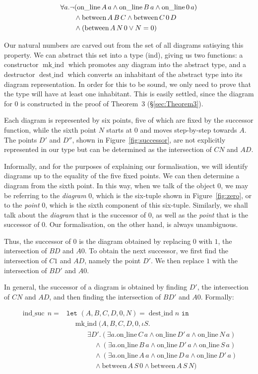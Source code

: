 \documentclass{article}
\DeclareMathOperator{\destind}{dest\_ind}
\DeclareMathOperator{\mkind}{mk\_ind}
\DeclareMathOperator{\indsuc}{ind\_suc}
\newcommand{\online}[2]{\text{on\_line}\,#1\,#2}
\newcommand{\between}[3]{\text{between}\,#1\,#2\,#3}
\newcommand{\Triangle}[4]{\forall #1.\neg(\online{#2}{a}\wedge \online{#3}{a}\wedge \online{#4}{a})}
\begin{document}
\begin{align}
&\Triangle{a}{A}{B}{0} \label{theorem:IndConstraint}\\
&\qquad\wedge \between{A}{B}{C} \wedge \between{C}{0}{D}\notag\\
&\qquad\wedge (\between{A}{N}{0} \vee N = 0)\notag
\end{align}

Our natural numbers are carved out from the set of all diagrams satisying this property. We can abstract this set into a type ($\text{ind}$), giving us two functions: a constructor $\mkind$ which promotes any diagram into the abstract type, and a destructor $\destind$ which converts an inhabitant of the abstract type into its diagram representation. In order for this to be sound, we only need to prove that the type will have at least one inhabitant. This is easily settled, since the diagram for $0$ is constructed in the proof of Theorem~3 (\S\ref{sec:Theorem3}). 

Each diagram is represented by six points, five of which are fixed by the successor function, while the sixth point $N$ starts at $0$ and moves step-by-step towards $A$. The points $D'$ and $D''$, shown in Figure~\ref{fig:successor}, are not explicitly represented in our type but can be determined as the intersection of $CN$ and $AD$.

Informally, and for the purposes of explaining our formalisation, we will identify diagrams up to the equality of the five fixed points. We can then determine a diagram from the sixth point. In this way, when we talk of the object $0$, we may be referring to the \emph{diagram} 0, which is the six-tuple shown in Figure~\ref{fig:zero}, or to the \emph{point} 0, which is the sixth component of this six-tuple. Similarly, we shall talk about the \emph{diagram} that is the successor of 0, as well as the \emph{point} that is the successor of 0. Our formalisation, on the other hand, is always unambiguous.

Thus, the successor of $0$ is the diagram obtained by replacing $0$ with $1$, the intersection of $BD$ and $A0$. To obtain the next successor, we first find the intersection of $C1$ and $AD$, namely the point $D'$. We then replace $1$ with the intersection of $BD'$ and $A0$. 

In general, the successor of a diagram is obtained by finding $D'$, the intersection of $CN$ and $AD$, and then finding the intersection of $BD'$ and $A0$. Formally:

\begin{align*}
\indsuc\, n =& \texttt{let } (A,B,C,D,0,N) = \destind n \texttt{ in}\\
&\quad \mkind (A,B,C,D,0,\iota S.\\
&\quad\qquad \exists D'. (\exists a. \online{C}{a} \wedge \online{D'}{a} \wedge \online{N}{a})\\
&\qquad\qquad \wedge (\exists a. \online{B}{a} \wedge \online{D'}{a} \wedge \online{S}{a})\\
&\qquad\qquad \wedge (\exists a. \online{A}{a} \wedge \online{D}{a} \wedge \online{D'}{a})\\
&\qquad\qquad \wedge \between{A}{S}{0} \wedge \between{A}{S}{N})
\end{align*}
\end{document}
